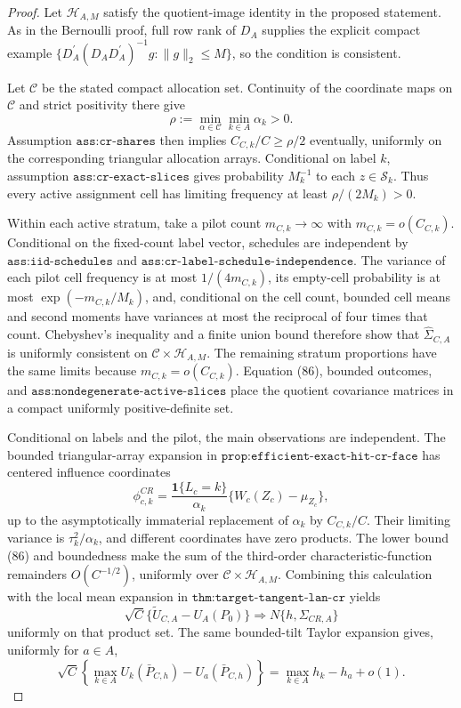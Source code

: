 \documentclass{article}
\begin{document}
\begin{proof}
Let \(\mathscr H_{A,M}\) satisfy the quotient-image identity in the proposed statement.  As in the Bernoulli proof, full row rank of \(D_A\) supplies the explicit compact example \(\{D_A^{\prime}(D_AD_A^{\prime})^{-1}g:\lVert g\rVert_2\leq M\}\), so the condition is consistent.

Let \(\mathcal C\) be the stated compact allocation set.  Continuity of the coordinate maps on \(\mathcal C\) and strict positivity there give
\[
\rho:=\min_{\alpha\in\mathcal C}\min_{k\in A}\alpha_k>0.          \tag{86}
\]
Assumption \(\texttt{ass:cr-shares}\) then implies \(C_{C,k}/C\geq\rho/2\) eventually, uniformly on the corresponding triangular allocation arrays.  Conditional on label \(k\), assumption \(\texttt{ass:cr-exact-slices}\) gives probability \(M_k^{-1}\) to each \(z\in\mathcal S_k\).  Thus every active assignment cell has limiting frequency at least \(\rho/(2M_k)>0\).

Within each active stratum, take a pilot count \(m_{C,k}\to\infty\) with \(m_{C,k}=o(C_{C,k})\).  Conditional on the fixed-count label vector, schedules are independent by \(\texttt{ass:iid-schedules}\) and \(\texttt{ass:cr-label-schedule-independence}\).  The variance of each pilot cell frequency is at most \(1/(4m_{C,k})\), its empty-cell probability is at most \(\exp(-m_{C,k}/M_k)\), and, conditional on the cell count, bounded cell means and second moments have variances at most the reciprocal of four times that count.  Chebyshev's inequality and a finite union bound therefore show that \(\widehat\Sigma_{C,A}\) is uniformly consistent on \(\mathcal C\times\mathscr H_{A,M}\).  The remaining stratum proportions have the same limits because \(m_{C,k}=o(C_{C,k})\).  Equation (86), bounded outcomes, and \(\texttt{ass:nondegenerate-active-slices}\) place the quotient covariance matrices in a compact uniformly positive-definite set.

Conditional on labels and the pilot, the main observations are independent.  The bounded triangular-array expansion in \(\texttt{prop:efficient-exact-hit-cr-face}\) has centered influence coordinates
\[
\phi_{c,k}^{CR}
=\frac{\mathbf1\{L_c=k\}}{\alpha_k}\{W_c(Z_c)-\mu_{Z_c}\},
\]
up to the asymptotically immaterial replacement of \(\alpha_k\) by \(C_{C,k}/C\).  Their limiting variance is \(\tau_k^2/\alpha_k\), and different coordinates have zero products.  The lower bound (86) and boundedness make the sum of the third-order characteristic-function remainders \(O(C^{-1/2})\), uniformly over \(\mathcal C\times\mathscr H_{A,M}\).  Combining this calculation with the local mean expansion in \(\texttt{thm:target-tangent-lan-cr}\) yields
\[
\sqrt C\{\widetilde U_{C,A}-U_A(P_0)\}
\Rightarrow N\{h,\Sigma_{CR,A}\}                                \tag{87}
\]
uniformly on that product set.  The same bounded-tilt Taylor expansion gives, uniformly for \(a\in A\),
\[
\sqrt C\!\left\{\max_{k\in A}U_k(\bar P_{C,h})
-U_a(\bar P_{C,h})\right\}
=\max_{k\in A}h_k-h_a+o(1).                                     \tag{88}
\]


\end{proof}
\end{document}
